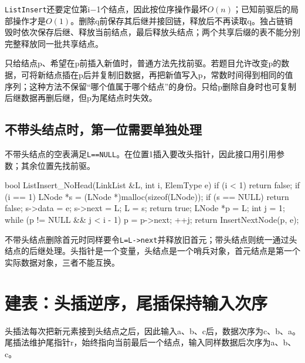 \texttt{ListInsert}还要定位第i\ensuremath{-}1个结点，因此按位序操作最坏\(O(n)\)；已知前驱后的局部操作才是\(O(1)\)。删除q前保存其后继并接回链，释放后不再读取q。独占链销毁时依次保存后继、释放当前结点，最后释放头结点；两个共享后缀的表不能分别完整释放同一批共享结点。

只给结点p、希望在p前插入新值时，普通方法先找前驱。若题目允许改变p的数据，可将新结点插在p后并复制旧数据，再把新值写入p，常数时间得到相同的值序列；这种方法不保留``哪个值属于哪个结点''的身份。只给p删除自身时也可复制后继数据再删后继，但p为尾结点时失效。

\subsection{不带头结点时，第一位需要单独处理}\label{DS02-nohead}

不带头结点的空表满足\texttt{L=\allowbreak{}=\allowbreak{}NULL}。在位置1插入要改头指针，因此接口用引用参数；其余位置先找前驱。

\par\medskip\noindent\begin{minipage}{\linewidth}
\begin{codeblock}[language=C++]
bool ListInsert_NoHead(LinkList &L, int i, ElemType e) {
    if (i < 1) return false;
    if (i == 1) {
        LNode *s = (LNode *)malloc(sizeof(LNode));
        if (s == NULL) return false;
        s->data = e;
        s->next = L;
        L = s;
        return true;
    }
    LNode *p = L;
    int j = 1;
    while (p != NULL && j < i - 1) {
        p = p->next; ++j;
    }
    return InsertNextNode(p, e);
}
\end{codeblock}
\end{minipage}\par\medskip

不带头结点删除首元时同样要令\texttt{L=\allowbreak{}L->\allowbreak{}next}并释放旧首元；带头结点则统一通过头结点的后继处理。头指针是一个变量，头结点是一个哨兵对象，首元结点是第一个实际数据对象，三者不能互换。

\section{建表：头插逆序，尾插保持输入次序}\label{DS02-build}

头插法每次把新元素接到头结点之后，因此输入a、b、c后，数据次序为c、b、a。尾插法维护尾指针r，始终指向当前最后一个结点，输入同样数据后次序为a、b、c。

